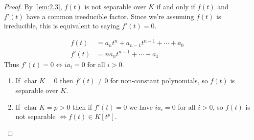 \documentclass{article}
\DeclareMathOperator{\chara}{char}
\begin{document}
\begin{proof}
    By \cref{lem:2.3}, $f(t)$ is not separable over $K$ if and only if $f(t)$ and $f'(t)$ have a common ireeducible factor.
    Since we're assuming $f(t)$ is irreducible, this is equivalent to saying $f'(t) = 0$.

    \begin{align*}
        f(t) &= a_n t^n + a_{n-1} t^{n-1} + \dotsb + a_0 \\
        f'(t) &= n a_n t^{n-1} + \dotsb + a_1
    \end{align*}
    Thus $f'(t) = 0 \iff i a_i = 0$ for all $i > 0$.

    \begin{enumerate}[label=(\roman*)]
        \item If $\chara K = 0$ then $f'(t) \neq 0$ for non-constant polynomials, so $f(t)$ is separable over $K$.
        \item If $\chara K = p > 0$ then if $f'(t) = 0$ we have $i a_i = 0$ for all $i > 0$, so $f(t)$ is not separable $\iff f(t) \in K[t^p]$.
    \end{enumerate}
\end{proof}

\end{document}

